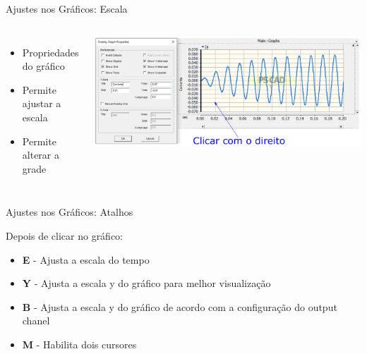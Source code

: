 \begin{frame}{Ajustes nos Gráficos: Escala}
\centering

\begin{columns}

\begin{itemize}
\item Propriedades do gráfico
\vspace*{1cm}
\item Permite ajustar a escala
\vspace*{1cm}
\item Permite alterar a grade
\end{itemize}


\centering
\includegraphics[width=0.9\linewidth]{./figuras/Visualizacao-resultados/graficos-escalas}

\end{columns}

\end{frame}





\begin{frame}{Ajustes nos Gráficos: Atalhos}

Depois de clicar no gráfico:
\vspace*{1cm}
\begin{itemize}
\item \textbf{E} - Ajusta a escala do tempo
\vspace*{0.75cm}
\item \textbf{Y} - Ajusta a escala y do gráfico para melhor visualização
\vspace*{0.75cm}
\item \textbf{B} - Ajusta a escala y do gráfico de acordo com a configuração do output chanel
\vspace*{0.75cm}
\item \textbf{M} - Habilita dois cursores 
\end{itemize}

\end{frame}




